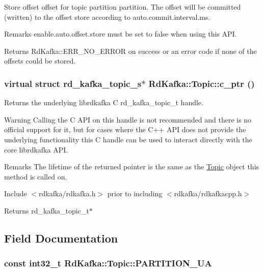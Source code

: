 Store offset {\ttfamily offset} for topic partition {\ttfamily partition}. The offset will be committed (written) to the offset store according to {\ttfamily auto.commit.interval.ms}. \begin{DoxyRemark}{Remarks}
{\ttfamily enable.auto.offset.store} must be set to {\ttfamily false} when using this API.
\end{DoxyRemark}
\begin{DoxyReturn}{Returns}
RdKafka::ERR\_\-NO\_\-ERROR on success or an error code if none of the offsets could be stored. 
\end{DoxyReturn}
\hypertarget{classRdKafka_1_1Topic_ab2b9c16211db4036939d95a5dbd07c94}{
\subsubsection[{c\_\-ptr}]{\setlength{\rightskip}{0pt plus 5cm}virtual struct rd\_\-kafka\_\-topic\_\-s$\ast$ RdKafka::Topic::c\_\-ptr ()}}
\label{classRdKafka_1_1Topic_ab2b9c16211db4036939d95a5dbd07c94}


Returns the underlying librdkafka C rd\_\-kafka\_\-topic\_\-t handle. \begin{DoxyWarning}{Warning}
Calling the C API on this handle is not recommended and there is no official support for it, but for cases where the C++ API does not provide the underlying functionality this C handle can be used to interact directly with the core librdkafka API.
\end{DoxyWarning}
\begin{DoxyRemark}{Remarks}
The lifetime of the returned pointer is the same as the \hyperlink{classRdKafka_1_1Topic}{Topic} object this method is called on.

Include $<$rdkafka/rdkafka.h$>$ prior to including $<$rdkafka/rdkafkacpp.h$>$
\end{DoxyRemark}
\begin{DoxyReturn}{Returns}
{\ttfamily rd\_\-kafka\_\-topic\_\-t$\ast$} 
\end{DoxyReturn}


\subsection{Field Documentation}
\hypertarget{classRdKafka_1_1Topic_ab69c18779df1c8e150648e640b159654}{
\subsubsection[{PARTITION\_\-UA}]{\setlength{\rightskip}{0pt plus 5cm}const int32\_\-t {\bf RdKafka::Topic::PARTITION\_\-UA}}}
\label{classRdKafka_1_1Topic_ab69c18779df1c8e150648e640b159654}



